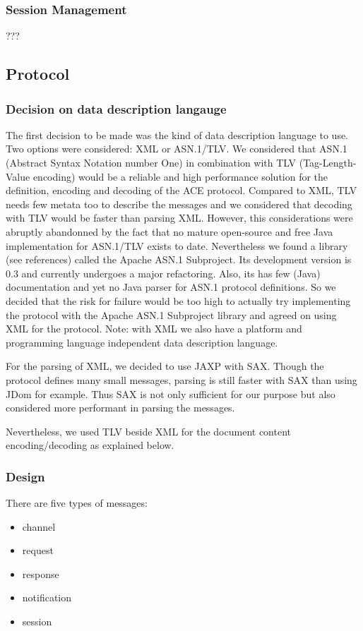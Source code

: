 \subsubsection{Session Management}
???

\subsection{Protocol}
\subsubsection{Decision on data description langauge}
The first decision to be made was the kind of data description language to use. Two options were considered: XML or ASN.1/TLV. We considered that ASN.1 (Abstract Syntax Notation number One) in combination with TLV (Tag-Length-Value encoding) would be a reliable and high performance solution for the definition, encoding and decoding of the ACE protocol. Compared to XML, TLV needs few metata too to describe the messages and we considered that decoding with TLV would be faster than parsing XML. However, this considerations were abruptly abandonned by the fact that no mature open-source and free Java implementation for ASN.1/TLV exists to date. Nevertheless we found a library (see references) called the Apache ASN.1 Subproject. Its development version is 0.3 and currently undergoes a major refactoring. Also, its has few (Java) documentation and yet no Java parser for ASN.1 protocol definitions. So we decided that the risk for failure would be too high to actually try implementing the protocol with the Apache ASN.1 Subproject library and agreed on using XML for the protocol. Note: with XML we also have a platform and programming language independent data description language.

For the parsing of XML, we decided to use JAXP with SAX. Though the protocol defines many small messages, parsing is still faster with SAX than using JDom for example. Thus SAX is not only sufficient for our purpose but also considered more performant in parsing the messages.

Nevertheless, we used TLV beside XML for the document content encoding/decoding as explained below.

\subsubsection{Design}
There are five types of messages:

\begin{itemize}
\item channel
\item request
\item response
\item notification
\item session
\end{itemize}

